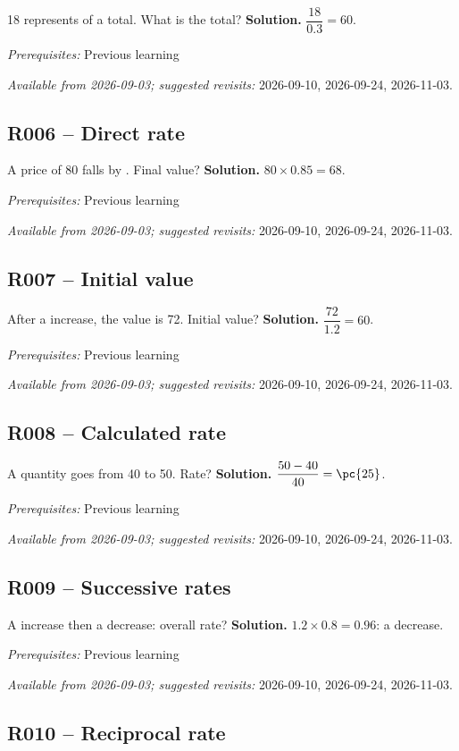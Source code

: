 18 represents  of a total. What is the total?
\ifmxteacher\textbf{Solution.} $\dfrac{18}{\num{0,3}}=60$.\par\textit{Prerequisites:} Previous learning\par\textit{Available from 2026-09-03; suggested revisits:} 2026-09-10, 2026-09-24, 2026-11-03.\fi
{}\subsection*{R006 -- Direct rate}\label{R006}
A price of 80 falls by . Final value?
\ifmxteacher\textbf{Solution.} $80\times\num{0,85}=68$.\par\textit{Prerequisites:} Previous learning\par\textit{Available from 2026-09-03; suggested revisits:} 2026-09-10, 2026-09-24, 2026-11-03.\fi
{}\subsection*{R007 -- Initial value}\label{R007}
After a  increase, the value is 72. Initial value?
\ifmxteacher\textbf{Solution.} $\dfrac{72}{\num{1,2}}=60$.\par\textit{Prerequisites:} Previous learning\par\textit{Available from 2026-09-03; suggested revisits:} 2026-09-10, 2026-09-24, 2026-11-03.\fi
{}\subsection*{R008 -- Calculated rate}\label{R008}
A quantity goes from 40 to 50. Rate?
\ifmxteacher\textbf{Solution.} $\dfrac{50-40}{40}=\pc{25}$.\par\textit{Prerequisites:} Previous learning\par\textit{Available from 2026-09-03; suggested revisits:} 2026-09-10, 2026-09-24, 2026-11-03.\fi
{}\subsection*{R009 -- Successive rates}\label{R009}
A  increase then a  decrease: overall rate?
\ifmxteacher\textbf{Solution.} $\num{1,2}\times\num{0,8}=\num{0,96}$: a  decrease.\par\textit{Prerequisites:} Previous learning\par\textit{Available from 2026-09-03; suggested revisits:} 2026-09-10, 2026-09-24, 2026-11-03.\fi
{}\subsection*{R010 -- Reciprocal rate}\label{R010}
